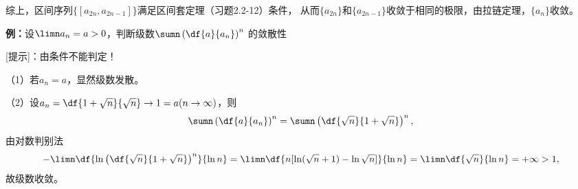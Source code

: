 综上，区间序列$\{[a_{2n},a_{2n-1}]\}$满足区间套定理（习题2.2-12）条件，
从而$\{a_{2n}\}$和$\{a_{2n-1}\}$收敛于相同的极限，由拉链定理，$\{a_n\}$收敛。

\bigskip

{\bf 例：}设$\limn a_n=a>0$，判断级数$\sumn\left(\df{a}{a_n}\right)^n$
的敛散性

[提示]：由条件不能判定！

（1）若$a_n=a$，显然级数发散。

（2）设$a_n=\df{1+\sqrt n}{\sqrt n}\to1=a(n\to\infty)$，则
$$\sumn\left(\df{a}{a_n}\right)^n=\sumn\left(\df{\sqrt n}
{1+\sqrt n}\right)^n,$$
由对数判别法
$$-\limn\df{\ln \left(\df{\sqrt n}{1+\sqrt n}\right)^n}
{\ln n}=\limn\df{n[\ln(\sqrt n+1)-\ln\sqrt n]}{\ln n}
=\limn\df{\sqrt n}{\ln n}=+\infty>1,$$
故级数收敛。
